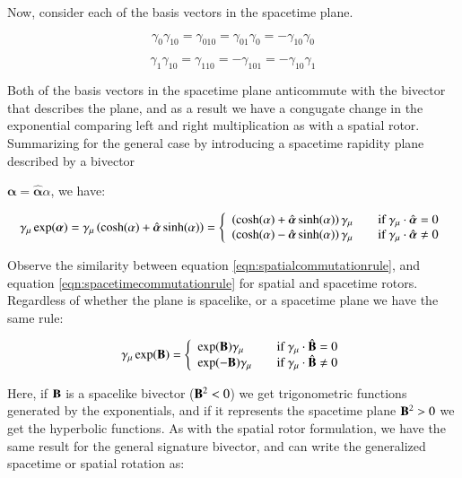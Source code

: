 \documentclass{article}      %
\newcommand{\Balpha}[0]{\boldsymbol{\alpha}}
\newcommand{\alphacap}[0]{\hat{\boldsymbol{\alpha}}}
\newcommand{\Bcap}[0]{\hat{\BB}}
\begin{document}
Now, consider each of the basis vectors in the spacetime plane.

\begin{equation*}
\gamma_{0} \gamma_{10}
= \gamma_{010}
= \gamma_{01} \gamma_{0}
= -\gamma_{10} \gamma_{0}
\end{equation*}

\begin{equation*}
\gamma_{1} \gamma_{10}
= \gamma_{110}
= -\gamma_{101}
= -\gamma_{10} \gamma_{1}
\end{equation*}

Both of the basis vectors in the spacetime plane anticommute with the bivector that describes the plane, and as a result we have a congugate change in the exponential comparing left and right multiplication as with a spatial rotor.  Summarizing for the general case by introducing a spacetime rapidity plane described by a bivector

$\Balpha = \alphacap \alpha$, we have:

\begin{equation}\label{eqn:spacetimecommutationrule}
\gamma_{\mu}\exp(\Balpha)
= \gamma_{\mu}\left( \cosh(\alpha) + \alphacap\sinh(\alpha) \right)
=
\left\{ 
\begin{array}{l l}
\left( \cosh(\alpha) + \alphacap\sinh(\alpha) \right) \gamma_{\mu} & \quad \mbox{if $\gamma_{\mu} \cdot \alphacap = 0$} \\
\left( \cosh(\alpha) - \alphacap\sinh(\alpha) \right) \gamma_{\mu} & \quad \mbox{if $\gamma_{\mu} \cdot \alphacap \ne 0$} \\
\end{array} \right.
\end{equation}

Observe the similarity between equation \ref{eqn:spatialcommutationrule}, and equation \ref{eqn:spacetimecommutationrule} for spatial
and spacetime rotors.  Regardless of whether the plane is spacelike, or a spacetime plane we have the same rule:

\begin{equation}\label{eqn:generalrule}
\gamma_{\mu}\exp(\BB)
=
\left\{ 
\begin{array}{l l}
\exp(\BB) \gamma_{\mu} & \quad \mbox{if $\gamma_{\mu} \cdot \Bcap = 0$} \\
\exp(-\BB) \gamma_{\mu} & \quad \mbox{if $\gamma_{\mu} \cdot \Bcap \ne 0$}
\end{array} \right.
\end{equation}

Here, if $\mathbf{B}$ is a spacelike bivector ($\mathbf{B}^2 < 0$) we get trigonometric functions generated by the exponentials, and if it represents
the spacetime plane $\mathbf{B}^2 > 0$ we get the hyperbolic functions.  As with the spatial rotor formulation, we have the same result for the
general signature bivector, and can write the generalized spacetime or spatial rotation as:
\end{document}

